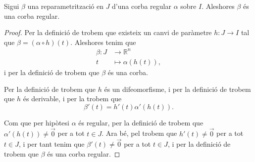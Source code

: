 \documentclass[../Apunts.tex]{subfiles}
\begin{document}
	\begin{proposition}
		Sigui \(\beta\) una reparametrització en \(J\) d'una corba regular \(\alpha\) sobre \(I\). Aleshores \(\beta\) és una corba regular.
		\begin{proof}
			Per la definició de  trobem que existeix un canvi de paràmetre \(h:J\longrightarrow I\) tal que \(\beta=(\alpha\circ h)(t)\). Aleshores tenim que
			\begin{align*}
				\beta\colon J&\longrightarrow\mathbb{R}^{n} \\
				t&\longmapsto\alpha(h(t)),
			\end{align*}
			i per la definició de  trobem que \(\beta\) és una corba.
			
			Per la definició de  trobem que \(h\) és un difeomorfisme, i per la definició de  trobem que \(h\) és derivable, i per la  trobem que
			\[\beta'(t)=h'(t)\alpha'(h(t)).\]
			
			Com que per hipòtesi \(\alpha\) és regular, per la definició de  trobem que \(\alpha'(h(t))\neq\vec{0}\) per a tot \(t\in J\). Ara bé, pel \corollari{}  trobem que \(h'(t)\neq\vec{0}\) per a tot \(t\in J\), i per tant tenim que \(\beta'(t)\neq\vec{0}\) per a tot \(t\in J\), i per la definició de  trobem que \(\beta\) és una corba regular.
		\end{proof}
	\end{proposition}
\end{document}
